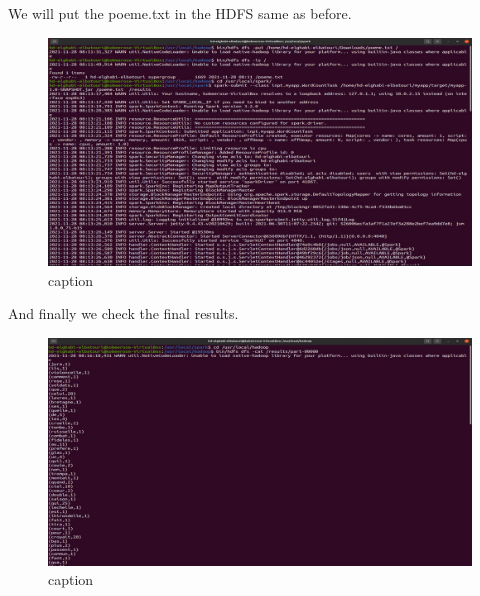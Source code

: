 \begin{spacing}{1.2}
\par We will put the poeme.txt in the HDFS same as before.
\\
\begin{figure}[!htb] 
\begin{center} 
\includegraphics[width=1\linewidth]{Big_Data/Spark/Running a Spark Batch app in Java/Spark Submit.jpg} 
\end{center} 
\caption{caption} 
\end{figure} 
\FloatBarrier
\par And finally we check the final results.
\\
\begin{figure}[!htb] 
\begin{center} 
\includegraphics[width=1\linewidth]{Big_Data/Spark/Running a Spark Batch app in Java/Final results.jpg} 
\end{center} 
\caption{caption} 
\end{figure} 
\FloatBarrier



\end{spacing}